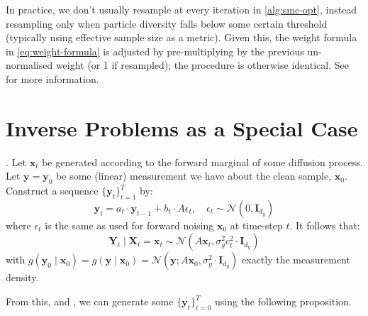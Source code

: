\begin{remark}
    In practice, we don't usually resample at every iteration in \ref{alg:smc-opt}, instead
    resampling only when particle diversity falls below some certain threshold (typically using
    effective sample size as a metric). Given this, the weight formula in \ref{eq:weight-formula} is
    adjusted by pre-multiplying by the previous un-normalised weight (or 1 if resampled); the
    procedure is otherwise identical. See \textcite{chopinIntroductionSequentialMonte2020} for
    more information.
\end{remark}

\section{Inverse Problems as a Special Case} \label{sec:inv-prob-spec-case}

\begin{proposition} \label{prop:obs-diffusion}
    \textcite[Proposition B.1]{douDiffusionPosteriorSampling2023}.
    Let $\mathbf{x}_t$ be generated according to the forward marginal of some diffusion process.
    Let $\mathbf{y} = \mathbf{y}_0$ be some (linear) measurement we have about the clean sample,
    $\mathbf{x}_0$. Construct a sequence $\{\mathbf{y}_t\}_{t=1}^T$ by:
    \begin{equation*}
        \mathbf{y}_t = a_t\cdot \mathbf{y}_{t-1} + b_t\cdot A\epsilon_t,\quad \epsilon_t \sim \mathcal{N}(0, \mathbf{I}_{d_y})
    \end{equation*}
    where $\epsilon_t$ is the same as used for forward noising $\mathbf{x}_0$ at time-step $t$.
    It follows that:
    \begin{equation}
        \mathbf{Y}_t \mid \mathbf{X}_t = \mathbf{x}_t \sim \mathcal{N}(A\mathbf{x}_t, \sigma_y^2c_t^2\cdot \mathbf{I}_{d_y}) \label{eq:obs-likelihood}
    \end{equation}
    with $g(\mathbf{y}_0 \mid \mathbf{x}_0) = g(\mathbf{y} \mid \mathbf{x}_0) = \mathcal{N}(\mathbf{y}; A\mathbf{x}_0, \sigma_y^2\cdot \mathbf{I}_{d_y})$
    exactly the measurement density.
\end{proposition}

From this, and \textcite[Remark B.1]{douDiffusionPosteriorSampling2023}, we can generate some
$\{\mathbf{y}_t\}_{t=0}^T$ using the following proposition.

